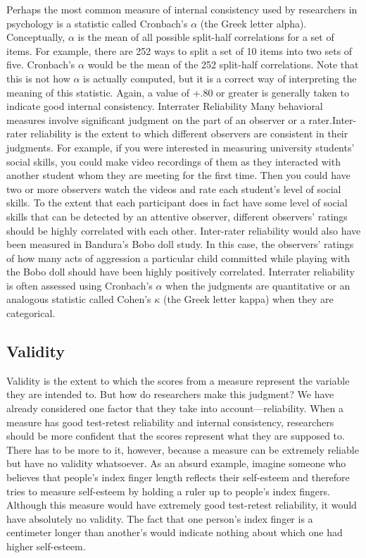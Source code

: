 Perhaps the most common measure of internal consistency used by researchers in psychology is a statistic called Cronbach's $\alpha$ (the Greek letter alpha). Conceptually, $\alpha$ is the mean of all possible split-half correlations for a set of items. For example, there are 252 ways to split a set of 10 items into two sets of five. Cronbach's $\alpha$ would be the mean of the 252 split-half correlations. Note that this is not how $\alpha$ is actually computed, but it is a correct way of interpreting the meaning of this statistic. Again, a value of +.80 or greater is generally taken to indicate good internal consistency.
Interrater Reliability
Many behavioral measures involve significant judgment on the part of an observer or a rater.Inter- rater reliability is the extent to which different observers are consistent in their judgments. For example, if you were interested in measuring university students' social skills, you could make video recordings of them as they interacted with another student whom they are meeting for the first time. Then you could have two or more observers watch the videos and rate each student's level of social skills. To the extent that each participant does in fact have some level of social skills that can be detected by an attentive observer, different observers' ratings should be highly correlated with each other. Inter-rater reliability would also have been measured in Bandura's Bobo doll study. In this case, the observers' ratings of how many acts of aggression a particular child committed while playing with the Bobo doll should have been highly positively correlated. Interrater reliability is often assessed using Cronbach's $\alpha$ when the judgments are quantitative or an analogous statistic called Cohen's $\kappa$ (the Greek letter kappa) when they are categorical.

\subsection{Validity}

Validity is the extent to which the scores from a measure represent the variable they are intended to. But how do researchers make this judgment? We have already considered one factor that they take into account—reliability. When a measure has good test-retest reliability and internal consistency, researchers should be more confident that the scores represent what they are supposed to. There has to be more to it, however, because a measure can be extremely reliable but have no validity whatsoever. As an absurd example, imagine someone who believes that people's index finger length reflects their self-esteem and therefore tries to measure self-esteem by holding a ruler up to people's index fingers. Although this measure would have extremely good test-retest reliability, it would have absolutely no validity. The fact that one person's index finger is a centimeter longer than another's would indicate nothing about which one had higher self-esteem.

